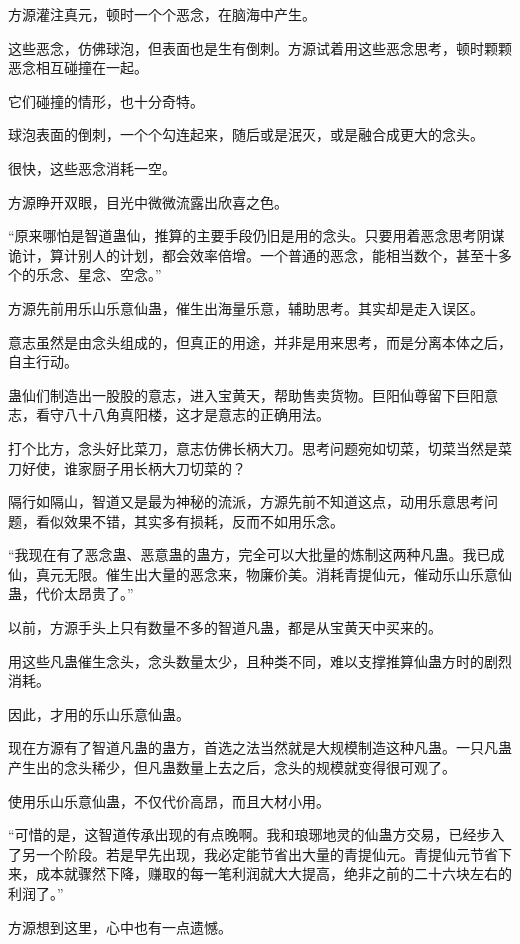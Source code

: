 \begin{this_body}
方源灌注真元，顿时一个个恶念，在脑海中产生。

这些恶念，仿佛球泡，但表面也是生有倒刺。方源试着用这些恶念思考，顿时颗颗恶念相互碰撞在一起。

它们碰撞的情形，也十分奇特。

球泡表面的倒刺，一个个勾连起来，随后或是泯灭，或是融合成更大的念头。

很快，这些恶念消耗一空。

方源睁开双眼，目光中微微流露出欣喜之色。

“原来哪怕是智道蛊仙，推算的主要手段仍旧是用的念头。只要用着恶念思考阴谋诡计，算计别人的计划，都会效率倍增。一个普通的恶念，能相当数个，甚至十多个的乐念、星念、空念。”

方源先前用乐山乐意仙蛊，催生出海量乐意，辅助思考。其实却是走入误区。

意志虽然是由念头组成的，但真正的用途，并非是用来思考，而是分离本体之后，自主行动。

蛊仙们制造出一股股的意志，进入宝黄天，帮助售卖货物。巨阳仙尊留下巨阳意志，看守八十八角真阳楼，这才是意志的正确用法。

打个比方，念头好比菜刀，意志仿佛长柄大刀。思考问题宛如切菜，切菜当然是菜刀好使，谁家厨子用长柄大刀切菜的？

隔行如隔山，智道又是最为神秘的流派，方源先前不知道这点，动用乐意思考问题，看似效果不错，其实多有损耗，反而不如用乐念。

“我现在有了恶念蛊、恶意蛊的蛊方，完全可以大批量的炼制这两种凡蛊。我已成仙，真元无限。催生出大量的恶念来，物廉价美。消耗青提仙元，催动乐山乐意仙蛊，代价太昂贵了。”

以前，方源手头上只有数量不多的智道凡蛊，都是从宝黄天中买来的。

用这些凡蛊催生念头，念头数量太少，且种类不同，难以支撑推算仙蛊方时的剧烈消耗。

因此，才用的乐山乐意仙蛊。

现在方源有了智道凡蛊的蛊方，首选之法当然就是大规模制造这种凡蛊。一只凡蛊产生出的念头稀少，但凡蛊数量上去之后，念头的规模就变得很可观了。

使用乐山乐意仙蛊，不仅代价高昂，而且大材小用。

“可惜的是，这智道传承出现的有点晚啊。我和琅琊地灵的仙蛊方交易，已经步入了另一个阶段。若是早先出现，我必定能节省出大量的青提仙元。青提仙元节省下来，成本就骤然下降，赚取的每一笔利润就大大提高，绝非之前的二十六块左右的利润了。”

方源想到这里，心中也有一点遗憾。


\end{this_body}

